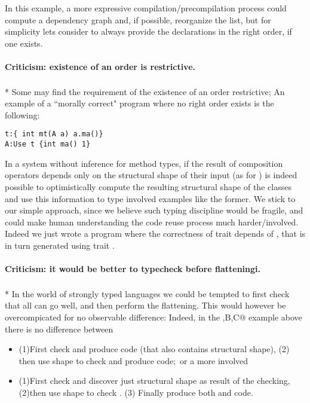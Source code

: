 In this example, a more expressive compilation/precompilation process 
could compute a dependency graph and, if possible, reorganize the list,
but for simplicity lets consider to always provide the declarations
in the right order, if one exists.

\paragraph*{Criticism: existence of an order is restrictive.}${}_{}$\\*
Some may find the requirement of the existence of an order restrictive;
An example of a ``morally correct" program where no right order exists is the following:
\begin{lstlisting}
t:{ int mt(A a) a.ma()}
A:Use t {int ma() 1}
\end{lstlisting}

In a system without inference for method types,
if the result of composition operators depends only on the
structural shape of their input (as for \use)
is indeed possible to optimistically compute the resulting structural shape of the classes
and use this information to type involved examples like the former.
We stick to our simple approach, since we believe such typing discipline would be fragile,
and could make human understanding the code reuse process much harder/involved.
Indeed we just wrote a program where the correctness of trait \Q@t@ depends of 
\Q@A@, that is in turn generated using trait \Q@t@.

\paragraph*{Criticism: it would be better to typecheck before flatteningi.}${}_{}$\\*
In the world of strongly typed languages we could be tempted to
first check that all can go well, and then perform the flattening.
This would however be overcompicated for no observable difference:
Indeed, in the \Q@A,B,C@ example above there is no difference
between
\begin{itemize}
\item  (1)First check \Q@B@ and produce \Q@B@ code (that also contains \Q@B@ structural shape),
  (2) then use \Q@B@ shape to check \Q@C@ and produce \Q@C@ code;\ 
or a more involved
\item  (1)First check \Q@B@ and discover just \Q@B@ structural shape as result of the checking,
  (2)then use \Q@B@ shape to check \Q@C@.
  (3) Finally produce both \Q@B@ and \Q@C@ code.
\end{itemize}

